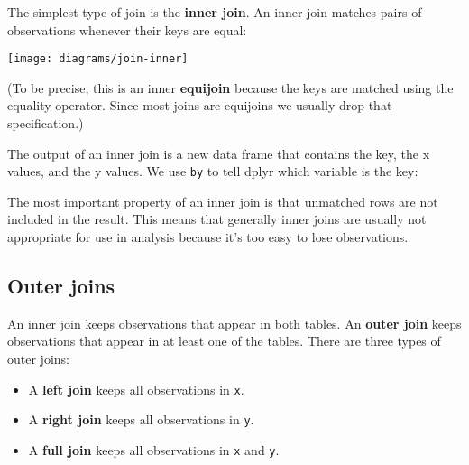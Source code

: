\documentclass[]{book}
\newenvironment{Shaded}{\begin{snugshade}}{\end{snugshade}}
\newcommand{\KeywordTok}[1]{\textcolor[rgb]{0.13,0.29,0.53}{\textbf{{#1}}}}
\newcommand{\DataTypeTok}[1]{\textcolor[rgb]{0.13,0.29,0.53}{{#1}}}
\newcommand{\StringTok}[1]{\textcolor[rgb]{0.31,0.60,0.02}{{#1}}}
\newcommand{\CommentTok}[1]{\textcolor[rgb]{0.56,0.35,0.01}{\textit{{#1}}}}
\newcommand{\NormalTok}[1]{{#1}}
\providecommand{\tightlist}{%
  \setlength{\itemsep}{0pt}\setlength{\parskip}{0pt}}
\begin{document}
The simplest type of join is the \textbf{inner join}. An inner join
matches pairs of observations whenever their keys are equal:

\begin{center}\texttt{[image: diagrams/join-inner]} \end{center}

(To be precise, this is an inner \textbf{equijoin} because the keys are
matched using the equality operator. Since most joins are equijoins we
usually drop that specification.)

The output of an inner join is a new data frame that contains the key,
the x values, and the y values. We use \texttt{by} to tell dplyr which
variable is the key:

\begin{Shaded}
\end{Shaded}

The most important property of an inner join is that unmatched rows are
not included in the result. This means that generally inner joins are
usually not appropriate for use in analysis because it's too easy to
lose observations.

\subsection{Outer joins}\label{outer-join}

An inner join keeps observations that appear in both tables. An
\textbf{outer join} keeps observations that appear in at least one of
the tables. There are three types of outer joins:

\begin{itemize}
\tightlist
\item
  A \textbf{left join} keeps all observations in \texttt{x}.
\item
  A \textbf{right join} keeps all observations in \texttt{y}.
\item
  A \textbf{full join} keeps all observations in \texttt{x} and
  \texttt{y}.
\end{itemize}
\end{document}
